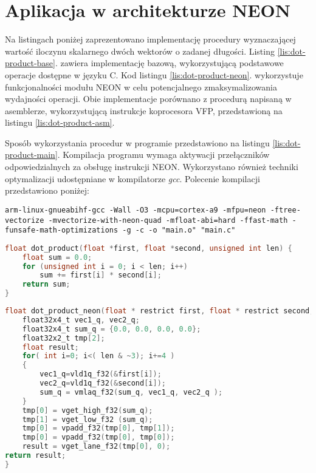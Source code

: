 \section{Aplikacja w architekturze NEON}
\label{cha:neon-source}


Na listingach poniżej zaprezentowano implementację procedury wyznaczającej wartość iloczynu skalarnego dwóch wektorów o zadanej długości. 
Listing \ref{lis:dot-product-base}. zawiera implementację bazową, wykorzystującą podstawowe operacje dostępne w języku C.
Kod listingu \ref{lis:dot-product-neon}. wykorzystuje funkcjonalności modułu NEON w celu potencjalnego zmaksymalizowania wydajności operacji. 
Obie implementacje porównano z procedurą napisaną w asemblerze, wykorzystującą instrukcje koprocesora VFP, przedstawioną na listingu \ref{lis:dot-product-asm}.

Sposób wykorzystania procedur w programie przedstawiono na listingu \ref{lis:dot-product-main}. 
Kompilacja programu wymaga aktywacji przełączników odpowiedzialnych za obsługę instrukcji NEON. 
Wykorzystano również techniki optymalizacji udostępniane w kompilatorze \textit{gcc}. 
Polecenie kompilacji przedstawiono poniżej:

\begin{lstlisting}[breaklines=true]
arm-linux-gnueabihf-gcc -Wall -O3 -mcpu=cortex-a9 -mfpu=neon -ftree-vectorize -mvectorize-with-neon-quad -mfloat-abi=hard -ffast-math -funsafe-math-optimizations -g -c -o "main.o" "main.c"
\end{lstlisting}

\begin{lstlisting}[breaklines=true, language=C, caption=Implementacja bazowa., label=lis:dot-product-base]
float dot_product(float *first, float *second, unsigned int len) {
	float sum = 0.0;
	for (unsigned int i = 0; i < len; i++)
		sum += first[i] * second[i];
	return sum;
}
\end{lstlisting}

\begin{lstlisting}[breaklines=true, language=C, caption=Implementacja w architekturze NEON. (Źródło: \cite{xilinx-neon}), label=lis:dot-product-neon]
float dot_product_neon(float * restrict first, float * restrict second, unsigned int len) {
	float32x4_t vec1_q, vec2_q;
	float32x4_t sum_q = {0.0, 0.0, 0.0, 0.0};
	float32x2_t tmp[2];
	float result;
	for( int i=0; i<( len & ~3); i+=4 )
	{
		vec1_q=vld1q_f32(&first[i]);
		vec2_q=vld1q_f32(&second[i]);
		sum_q = vmlaq_f32(sum_q, vec1_q, vec2_q );
	}
	tmp[0] = vget_high_f32(sum_q);
	tmp[1] = vget_low_f32 (sum_q);
	tmp[0] = vpadd_f32(tmp[0], tmp[1]);
	tmp[0] = vpadd_f32(tmp[0], tmp[0]);
	result = vget_lane_f32(tmp[0], 0);
return result;
}
\end{lstlisting}

